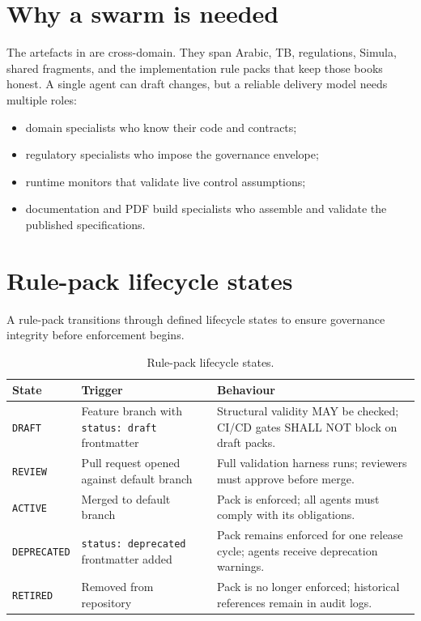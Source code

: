 \section{Why a swarm is needed}

The artefacts in  are cross-domain. They span
Arabic, TB, regulations, Simula, shared fragments, and the
implementation rule packs that keep those books honest. A single agent
can draft changes, but a reliable delivery model needs multiple roles:
\begin{itemize}
  \item domain specialists who know their code and contracts;
  \item regulatory specialists who impose the governance envelope;
  \item runtime monitors that validate live control assumptions;
  \item documentation and PDF build specialists who assemble and
    validate the published specifications.
\end{itemize}

\section{Rule-pack lifecycle states}
\label{sec:lifecycle-states}

A rule-pack transitions through defined lifecycle states to ensure
governance integrity before enforcement begins.

\begin{table}[htbp]
\centering
\footnotesize
\caption{Rule-pack lifecycle states.}
\label{tab:lifecycle-states}
\begin{tabularx}{\textwidth}{@{}l l X@{}}
\toprule
\textbf{State} & \textbf{Trigger} & \textbf{Behaviour} \\
\midrule
\texttt{DRAFT} & Feature branch with \texttt{status: draft} frontmatter & Structural validity MAY be checked; CI/CD gates SHALL NOT block on draft packs. \\
\texttt{REVIEW} & Pull request opened against default branch & Full validation harness runs; reviewers must approve before merge. \\
\texttt{ACTIVE} & Merged to default branch & Pack is enforced; all agents must comply with its obligations. \\
\texttt{DEPRECATED} & \texttt{status: deprecated} frontmatter added & Pack remains enforced for one release cycle; agents receive deprecation warnings. \\
\texttt{RETIRED} & Removed from repository & Pack is no longer enforced; historical references remain in audit logs. \\
\bottomrule
\end{tabularx}
\end{table}

